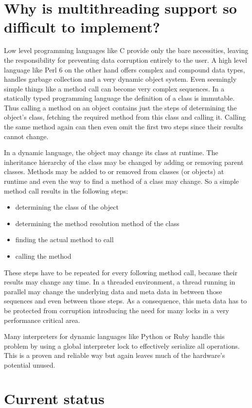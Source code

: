 \documentclass[bachelor,english]{hgbthesis}
\begin{document}
\section{Why is multithreading support so difficult to implement?}

Low level programming languages like C provide only the bare necessities, leaving the responsibility for preventing data corruption entirely to the user. A high level language like Perl 6 on the other hand offers complex and compound data types, handles garbage collection and a very dynamic object system. Even seemingly simple things like a method call can become very complex sequences. In a statically typed programming language the definition of a class is immutable. Thus calling a method on an object contains just the steps of determining the object's class, fetching the required method from this class and calling it. Calling the same method again can then even omit the first two steps since their results cannot change.

In a dynamic language, the object may change its class at runtime. The inheritance hierarchy of the class may be changed by adding or removing parent classes. Methods may be added to or removed from classes (or objects) at runtime and even the way to find a method of a class may change. So a simple method call results in the following steps:
%
\begin{itemize}
\item determining the class of the object
\item determining the method resolution method of the class
\item finding the actual method to call
\item calling the method
\end{itemize}
%
These steps have to be repeated for every following method call, because their results may change any time. In a threaded environment, a thread running in parallel may change the underlying data and meta data in between those sequences and even between those steps. As a consequence, this meta data has to be protected from corruption introducing the need for many locks in a very performance critical area.

Many interpreters for dynamic languages like Python or Ruby handle this problem by using a global interpreter lock to effectively serialize all operations. This is a proven and reliable way but again leaves much of the hardware's potential unused.

\section{Current status}
\end{document}
